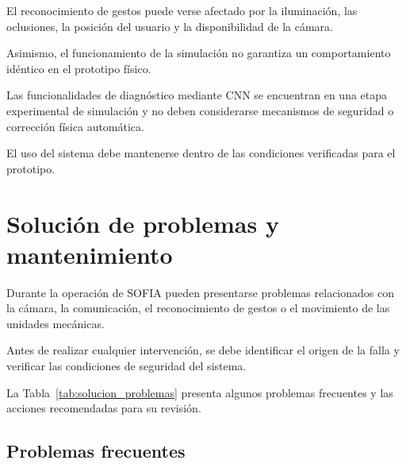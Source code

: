 \documentclass[letterpaper,journal]{IEEEtran}
\begin{document}
El reconocimiento de gestos
puede verse afectado por
la iluminación, las oclusiones,
la posición del usuario
y la disponibilidad de la cámara.

Asimismo, el funcionamiento
de la simulación no garantiza
un comportamiento idéntico
en el prototipo físico.

Las funcionalidades de diagnóstico
mediante CNN se encuentran
en una etapa experimental
de simulación y no deben
considerarse mecanismos de
seguridad o corrección física
automática.

El uso del sistema debe
mantenerse dentro de las
condiciones verificadas
para el prototipo.

\section{Solución de problemas y mantenimiento}
\label{sec:solucion_problemas}

Durante la operación de SOFIA pueden presentarse
problemas relacionados con la cámara, la
comunicación, el reconocimiento de gestos
o el movimiento de las unidades mecánicas.

Antes de realizar cualquier intervención,
se debe identificar el origen de la falla
y verificar las condiciones de seguridad
del sistema.

La Tabla~\ref{tab:solucion_problemas} presenta
algunos problemas frecuentes y las acciones
recomendadas para su revisión.

\subsection{Problemas frecuentes}
\end{document}
